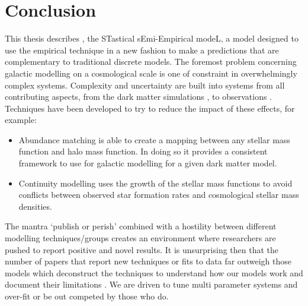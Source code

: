 
\chapter{Conclusion} %
\label{Chapter:Conclusion}

This thesis describes \steel, the STastical sEmi-Empirical modeL, a model designed to use the empirical technique in a new fashion to make a predictions that are complementary to traditional discrete models. The foremost problem concerning galactic modelling on a cosmological scale is one of constraint in overwhelmingly complex systems. Complexity and uncertainty are built into systems from all contributing aspects, from the dark matter simulations \cite[e.g.]{vandenBosch2018DisruptionFiction}, to observations \cite[e.g.]{Bernardi2017ComparingLight, Lapi2017StellarEquation, Leja2019AnSurvey}. Techniques have been developed to try to reduce the impact of these effects, for example:
\begin{itemize}
    \item Abundance matching is able to create a mapping between any stellar mass function and halo mass function. In doing so it provides a consistent framework to use for galactic modelling for a given dark matter model.
    \item Continuity modelling uses the growth of the stellar mass functions to avoid conflicts between observed star formation rates and cosmological stellar mass densities. 
\end{itemize}

The mantra `publish or perish' combined with a hostility between different modelling techniques/groups creates an environment where researchers are pushed to report positive and novel results. It is unsurprising then that the number of papers that report new techniques or fits to data far outweigh those models which deconstruct the techniques to understand how our models work and document their limitations \cite[e.g.][]{vandenBosch2017DissectingSimulation, vandenBosch2018DisruptionFiction, Asquith2018CosmicModels}. We are driven to tune multi parameter systems and over-fit or be out competed by those who do.


